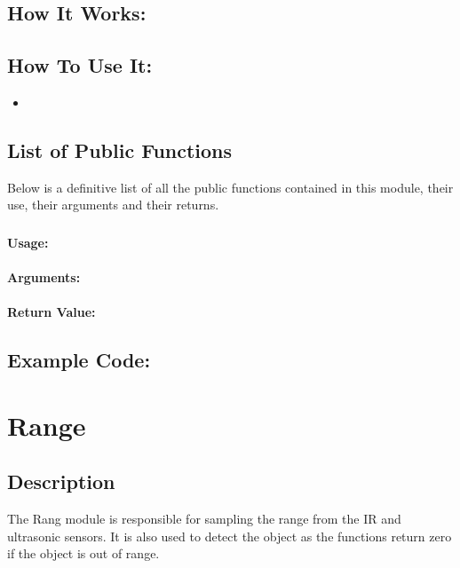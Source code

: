 \documentclass[]{report}
\begin{document}
\section{How It Works:}

\section{How To Use It:}
\begin{itemize}
	\item 
\end{itemize}

\section{List of Public Functions}
Below is a definitive list of all the public functions contained in this module, their use, their arguments and their returns.

\subsection{}
\subsubsection{Usage:}

\subsubsection{Arguments:}

\subsubsection{Return Value:}

\section{Example Code:}

\chapter{Range}
\section{Description}
The Rang module is responsible for sampling the range from the IR and ultrasonic sensors. It is also used to detect the object as the functions return zero if the object is out of range.
\end{document}
